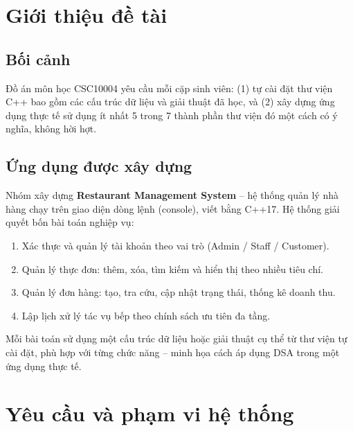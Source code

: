 \documentclass[12pt, a4paper]{article}
\begin{document}
\tableofcontents
\newpage

\section{Giới thiệu đề tài}

\subsection{Bối cảnh}

Đồ án môn học CSC10004 yêu cầu mỗi cặp sinh viên: (1) tự cài đặt thư viện C++ bao gồm các cấu
trúc dữ liệu và giải thuật đã học, và (2) xây dựng ứng dụng thực tế sử dụng ít nhất 5 trong 7
thành phần thư viện đó một cách có ý nghĩa, không hời hợt.

\subsection{Ứng dụng được xây dựng}

Nhóm xây dựng \textbf{Restaurant Management System} -- hệ thống quản lý nhà hàng chạy trên
giao diện dòng lệnh (console), viết bằng C++17. Hệ thống giải quyết bốn bài toán nghiệp vụ:

\begin{enumerate}
  \item Xác thực và quản lý tài khoản theo vai trò (Admin / Staff / Customer).
  \item Quản lý thực đơn: thêm, xóa, tìm kiếm và hiển thị theo nhiều tiêu chí.
  \item Quản lý đơn hàng: tạo, tra cứu, cập nhật trạng thái, thống kê doanh thu.
  \item Lập lịch xử lý tác vụ bếp theo chính sách ưu tiên đa tầng.
\end{enumerate}

Mỗi bài toán sử dụng một cấu trúc dữ liệu hoặc giải thuật cụ thể từ thư viện tự cài đặt, phù hợp
với từng chức năng -- minh họa cách áp dụng DSA trong một ứng dụng thực tế.

\section{Yêu cầu và phạm vi hệ thống}
\end{document}
